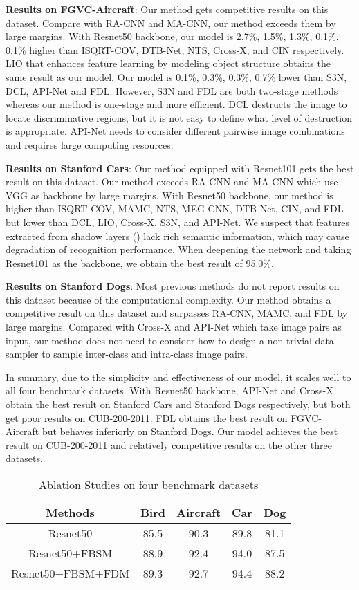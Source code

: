 \documentclass[conference]{IEEEtran}
\begin{document}
	\textbf{Results on FGVC-Aircraft}: Our method gets competitive results on this dataset. Compare with RA-CNN and MA-CNN, our method exceeds them by large margins. With Resnet50 backbone, our model is 2.7\%, 1.5\%, 1.3\%, 0.1\%, 0.1\% higher than ISQRT-COV, DTB-Net, NTS, Cross-X, and CIN respectively. 
	LIO that enhances feature learning by modeling object structure obtains the same result as our model. 
	Our model is 0.1\%, 0.3\%, 0.3\%, 0.7\% lower than S3N, DCL, API-Net and FDL. However, S3N and FDL are both two-stage methods whereas our method is one-stage and more efficient. DCL destructs the image to locate discriminative regions, but it is not easy to define what level of destruction is appropriate. API-Net needs to consider different pairwise image combinations and requires large computing resources.
	
	\textbf{Results on Stanford Cars}: Our method equipped with Resnet101 gets the best result on this dataset. Our method exceeds RA-CNN and MA-CNN which use VGG\cite{VGG} as backbone by large margins. With Resnet50 backbone, our method is higher than ISQRT-COV, MAMC, NTS, MEG-CNN, DTB-Net, CIN, and FDL but lower than DCL, LIO, Cross-X, S3N, and API-Net.
	We suspect that features extracted from shadow layers () lack rich semantic information, which may cause degradation of recognition performance.
	When deepening the network and taking Resnet101 as the backbone, we obtain the best result of 95.0\%.
	
	\textbf{Results on Stanford Dogs}: Most previous methods do not report results on this dataset because of the computational complexity.
	Our method obtains a competitive result on this dataset and surpasses RA-CNN, MAMC, and FDL by large margins. Compared with Cross-X and API-Net which take image pairs as input, our method does not need to consider how to design a non-trivial data sampler to sample inter-class and intra-class image pairs\cite{Sampling}.
	
	In summary, due to the simplicity and effectiveness of our model, it scales well to all four benchmark datasets. With Resnet50 backbone, API-Net and Cross-X obtain the best result on Stanford Cars and Stanford Dogs respectively, but both get poor results on CUB-200-2011. FDL obtains the best result on FGVC-Aircraft but behaves inferiorly on 
	Stanford Dogs. Our model achieves the best result on CUB-200-2011 and relatively competitive results on the other three datasets.
	\begin{table}
		\caption{Ablation Studies on four benchmark datasets}
		\label{table:ablation}
		\centering
		\begin{tabular}{ccccc}
			\hline
			\textbf{Methods} &\textbf{Bird}  &\textbf{Aircraft} 
			&\textbf{Car} &\textbf{Dog}\\ \hline
			Resnet50 &85.5 &90.3 &89.8 &81.1 \\
			Resnet50+FBSM &88.9 &92.4 &94.0 &87.5 \\
			Resnet50+FBSM+FDM &89.3 &92.7 &94.4 &88.2 \\
			\hline
		\end{tabular}
	\end{table}
\end{document}
